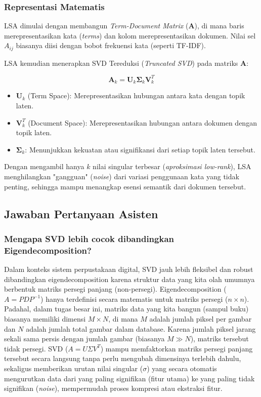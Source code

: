 \documentclass[12pt,a4paper]{article}
\begin{document}
\subsubsection{Representasi Matematis}
LSA dimulai dengan membangun \textit{Term-Document Matrix} ($\mathbf{A}$), di mana baris merepresentasikan kata (\textit{terms}) dan kolom merepresentasikan dokumen. Nilai sel $A_{ij}$ biasanya diisi dengan bobot frekuensi kata (seperti TF-IDF).

LSA kemudian menerapkan SVD Tereduksi (\textit{Truncated SVD}) pada matriks $\mathbf{A}$:

$$\mathbf{A}_k = \mathbf{U}_k \mathbf{\Sigma}_k \mathbf{V}_k^T$$

\begin{itemize}
    \item $\mathbf{U}_k$ (Term Space): Merepresentasikan hubungan antara kata dengan topik laten.
    \item $\mathbf{V}_k^T$ (Document Space): Merepresentasikan hubungan antara dokumen dengan topik laten.
    \item $\mathbf{\Sigma}_k$: Menunjukkan kekuatan atau signifikansi dari setiap topik laten tersebut.
\end{itemize}

Dengan mengambil hanya $k$ nilai singular terbesar (\textit{aproksimasi low-rank}), LSA menghilangkan "gangguan" (\textit{noise}) dari variasi penggunaan kata yang tidak penting, sehingga mampu menangkap esensi semantik dari dokumen tersebut.

\subsection{Jawaban Pertanyaan Asisten}
\subsubsection{Mengapa SVD lebih cocok dibandingkan Eigendecomposition?}
Dalam konteks sistem perpustakaan digital, SVD jauh lebih fleksibel dan robust dibandingkan eigendecomposition karena struktur data yang kita olah umumnya berbentuk matriks persegi panjang (non-persegi). Eigendecomposition ($A = PDP^{-1}$) hanya terdefinisi secara matematis untuk matriks persegi ($n \times n$). Padahal, dalam tugas besar ini, matriks data yang kita bangun (sampul buku) biasanya memiliki dimensi $M \times N$, di mana $M$ adalah jumlah piksel per gambar dan $N$ adalah jumlah total gambar dalam database. Karena jumlah piksel jarang sekali sama persis dengan jumlah gambar (biasanya $M \gg N$), matriks tersebut tidak persegi. SVD ($A = U \Sigma V^T$) mampu memfaktorkan matriks persegi panjang tersebut secara langsung tanpa perlu mengubah dimensinya terlebih dahulu, sekaligus memberikan urutan nilai singular ($\sigma$) yang secara otomatis mengurutkan data dari yang paling signifikan (fitur utama) ke yang paling tidak signifikan (\textit{noise}), mempermudah proses kompresi atau ekstraksi fitur.
\end{document}
